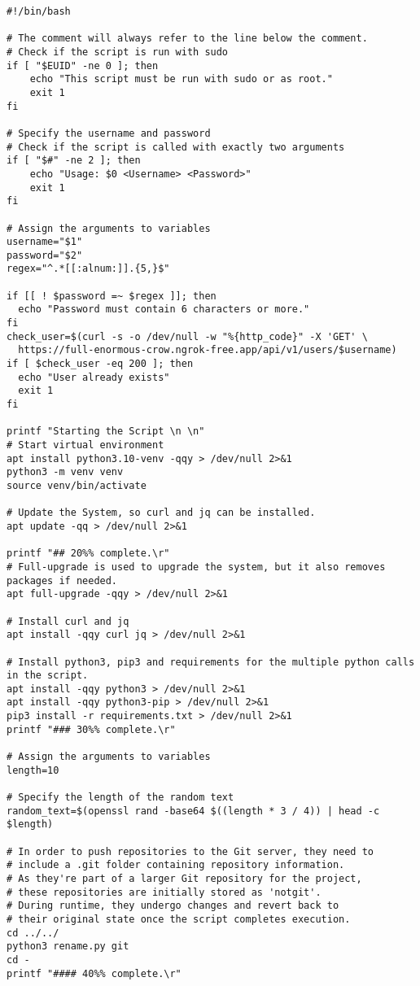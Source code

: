 \begin{verbatim}
#!/bin/bash

# The comment will always refer to the line below the comment.
# Check if the script is run with sudo
if [ "$EUID" -ne 0 ]; then
    echo "This script must be run with sudo or as root."
    exit 1
fi

# Specify the username and password
# Check if the script is called with exactly two arguments
if [ "$#" -ne 2 ]; then
    echo "Usage: $0 <Username> <Password>"
    exit 1
fi

# Assign the arguments to variables
username="$1"
password="$2"
regex="^.*[[:alnum:]].{5,}$"

if [[ ! $password =~ $regex ]]; then
  echo "Password must contain 6 characters or more."
fi
check_user=$(curl -s -o /dev/null -w "%{http_code}" -X 'GET' \
  https://full-enormous-crow.ngrok-free.app/api/v1/users/$username)
if [ $check_user -eq 200 ]; then
  echo "User already exists"
  exit 1
fi

printf "Starting the Script \n \n"
# Start virtual environment
apt install python3.10-venv -qqy > /dev/null 2>&1
python3 -m venv venv
source venv/bin/activate

# Update the System, so curl and jq can be installed.
apt update -qq > /dev/null 2>&1

printf "## 20%% complete.\r"
# Full-upgrade is used to upgrade the system, but it also removes packages if needed.
apt full-upgrade -qqy > /dev/null 2>&1

# Install curl and jq
apt install -qqy curl jq > /dev/null 2>&1

# Install python3, pip3 and requirements for the multiple python calls in the script.
apt install -qqy python3 > /dev/null 2>&1
apt install -qqy python3-pip > /dev/null 2>&1
pip3 install -r requirements.txt > /dev/null 2>&1
printf "### 30%% complete.\r"

# Assign the arguments to variables
length=10

# Specify the length of the random text
random_text=$(openssl rand -base64 $((length * 3 / 4)) | head -c $length)

# In order to push repositories to the Git server, they need to 
# include a .git folder containing repository information. 
# As they're part of a larger Git repository for the project, 
# these repositories are initially stored as 'notgit'.
# During runtime, they undergo changes and revert back to 
# their original state once the script completes execution.
cd ../../
python3 rename.py git
cd -
printf "#### 40%% complete.\r"


\end{verbatim}
